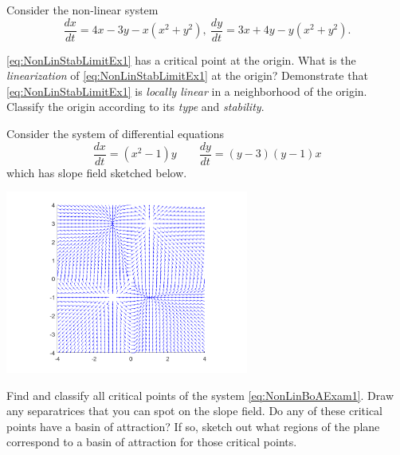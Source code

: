 \documentclass{ximera}
\begin{document}
\begin{exercise}
    Consider the non-linear system
    \begin{equation}
        \frac{dx}{dt}=4x-3y-x(x^2+y^2), \ \frac{dy}{dt}=3x+4y-y(x^2+y^2). \label{eq:NonLinStabLimitEx1} %
    \end{equation}
    \begin{tasks}
        \task \eqref{eq:NonLinStabLimitEx1} has a critical point at the origin. What is the {\it linearization} of \eqref{eq:NonLinStabLimitEx1} at the origin?
        \task Demonstrate that \eqref{eq:NonLinStabLimitEx1} is {\it locally linear} in a neighborhood of the origin. 
        \task Classify the origin according to its {\it type} and {\it stability}.
    \end{tasks}
\end{exercise}

\begin{exercise} 
    Consider the system of differential equations
    \begin{equation}
        \frac{dx}{dt} = (x^2 - 1)y \qquad \frac{dy}{dt} = (y-3)(y-1)x \label{eq:NonLinBoAExam1}
    \end{equation}
    which has slope field sketched below.
    \begin{center}
        \includegraphics[width=0.6\textwidth]{figures/NLBoA_Ex1.png}
    \end{center}
    \begin{tasks}
        \task Find and classify all critical points of the system \eqref{eq:NonLinBoAExam1}.
        \task Draw any separatrices that you can spot on the slope field.
        \task Do any of these critical points have a basin of attraction? If so, sketch out what regions of the plane correspond to a basin of attraction for those critical points. 
    \end{tasks}
\end{exercise}
% 
\end{document}
